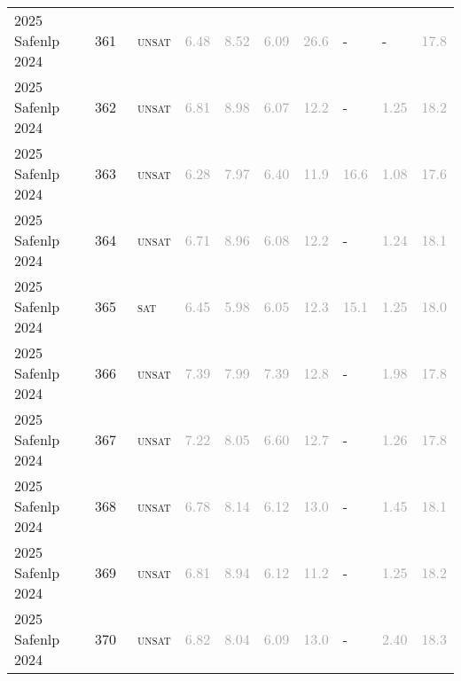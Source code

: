 \begin{center}
{\begin{longtable}{@{}llllllllll@{}}
2025 Safenlp 2024 & 361 & ~\textsc{unsat} & \textcolor{darkgray}{6.48} & \textcolor{darkgray}{8.52} & \textcolor{darkgray}{6.09} & \textcolor{darkgray}{26.6} & - & - & \textcolor{darkgray}{17.8} \\
2025 Safenlp 2024 & 362 & ~\textsc{unsat} & \textcolor{darkgray}{6.81} & \textcolor{darkgray}{8.98} & \textcolor{darkgray}{6.07} & \textcolor{darkgray}{12.2} & - & \textcolor{darkgray}{1.25} & \textcolor{darkgray}{18.2} \\
2025 Safenlp 2024 & 363 & ~\textsc{unsat} & \textcolor{darkgray}{6.28} & \textcolor{darkgray}{7.97} & \textcolor{darkgray}{6.40} & \textcolor{darkgray}{11.9} & \textcolor{darkgray}{16.6} & \textcolor{darkgray}{1.08} & \textcolor{darkgray}{17.6} \\
2025 Safenlp 2024 & 364 & ~\textsc{unsat} & \textcolor{darkgray}{6.71} & \textcolor{darkgray}{8.96} & \textcolor{darkgray}{6.08} & \textcolor{darkgray}{12.2} & - & \textcolor{darkgray}{1.24} & \textcolor{darkgray}{18.1} \\
2025 Safenlp 2024 & 365 & ~\textsc{sat} & \textcolor{darkgray}{6.45} & \textcolor{darkgray}{5.98} & \textcolor{darkgray}{6.05} & \textcolor{darkgray}{12.3} & \textcolor{darkgray}{15.1} & \textcolor{darkgray}{1.25} & \textcolor{darkgray}{18.0} \\
2025 Safenlp 2024 & 366 & ~\textsc{unsat} & \textcolor{darkgray}{7.39} & \textcolor{darkgray}{7.99} & \textcolor{darkgray}{7.39} & \textcolor{darkgray}{12.8} & - & \textcolor{darkgray}{1.98} & \textcolor{darkgray}{17.8} \\
2025 Safenlp 2024 & 367 & ~\textsc{unsat} & \textcolor{darkgray}{7.22} & \textcolor{darkgray}{8.05} & \textcolor{darkgray}{6.60} & \textcolor{darkgray}{12.7} & - & \textcolor{darkgray}{1.26} & \textcolor{darkgray}{17.8} \\
2025 Safenlp 2024 & 368 & ~\textsc{unsat} & \textcolor{darkgray}{6.78} & \textcolor{darkgray}{8.14} & \textcolor{darkgray}{6.12} & \textcolor{darkgray}{13.0} & - & \textcolor{darkgray}{1.45} & \textcolor{darkgray}{18.1} \\
2025 Safenlp 2024 & 369 & ~\textsc{unsat} & \textcolor{darkgray}{6.81} & \textcolor{darkgray}{8.94} & \textcolor{darkgray}{6.12} & \textcolor{darkgray}{11.2} & - & \textcolor{darkgray}{1.25} & \textcolor{darkgray}{18.2} \\
2025 Safenlp 2024 & 370 & ~\textsc{unsat} & \textcolor{darkgray}{6.82} & \textcolor{darkgray}{8.04} & \textcolor{darkgray}{6.09} & \textcolor{darkgray}{13.0} & - & \textcolor{darkgray}{2.40} & \textcolor{darkgray}{18.3} \\

\end{longtable}}
\end{center}

